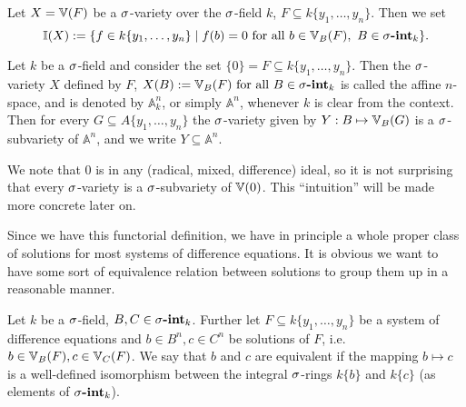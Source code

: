 \begin{defn}\label{defnI}
Let $X = \mathbb{V}(F)$ be a $\sigma$-variety over the $\sigma$-field $k$, $F \subseteq k\{y_1,\ldots,y_n\}$. Then we set $$\mathbb{I}(X):= \{ f \in k\{y_1,\ldots,y_n\} \mid f(b) = 0 \text{ for all } b \in \mathbb{V}_B(F), ~ B \in \sigma\text{{\normalfont\textbf{-int}}}_k \}.$$ 
\end{defn}

\begin{ex}\label{A^n}
Let $k$ be a $\sigma$-field and consider the set $\{ 0 \} = F \subseteq k\{y_1,\ldots,y_n\}$. Then the $\sigma$-variety $X$ defined by $F$, $X(B) := \mathbb{V}_B(F) \text{ for all } B \in \sigma\text{{\normalfont\textbf{-int}}}_k$ is called the affine $n$-space, and is denoted by $\mathbb{A}^n_k$, 
or simply $\mathbb{A}^n$, whenever $k$ is clear from the context. Then for every $G \subseteq A\{y_1,\ldots,y_n\}$ the $\sigma$-variety given by $Y: B \mapsto \mathbb{V}_B(G)$ is a $\sigma$-subvariety of $\mathbb{A}^n$, 
and we write $Y \subseteq \mathbb{A}^n$.
\end{ex}

We note that $0$ is in any (radical, mixed, difference) ideal, so it is not surprising that every $\sigma$-variety is a $\sigma$-subvariety of $\mathbb{V}(0)$. This ``intuition'' will be made more concrete later on.

Since we have this functorial definition, we have in principle a whole proper class of solutions for most systems of difference equations. 
It is obvious we want to have some sort of equivalence relation between solutions to group them up in a reasonable manner.

\begin{defn}\label{equivsols}
Let $k$ be a $\sigma$-field, $B,C \in \sigma\text{{\normalfont\textbf{-int}}}_k$. Further let $F \subseteq k\{y_1,\ldots,y_n\}$ be a system of difference equations and $b \in B^n, c \in C^n$ be solutions of $F$, i.e. $b \in \mathbb{V}_B(F), c \in \mathbb{V}_C(F)$.
We say that $b$ and $c$ are equivalent if the mapping $b \mapsto c$ is a well-defined isomorphism between the integral $\sigma$-rings $k\{b\}$ and $k\{c\}$  (as elements of $\sigma\text{{\normalfont\textbf{-int}}}_k$). 
\end{defn}



